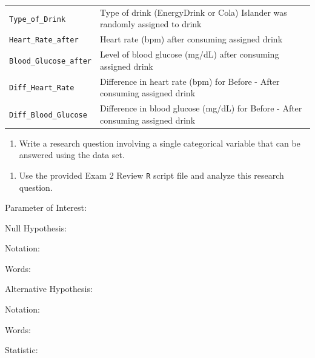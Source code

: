 \documentclass[
]{report}
\providecommand{\tightlist}{%
  \setlength{\itemsep}{0pt}\setlength{\parskip}{0pt}}
\newcommand{\rgi}{\hspace{24pt}}  %
\begin{document}
\begin{longtable}[]{@{}
  >{\raggedright\arraybackslash}p{}
  >{\raggedright\arraybackslash}p{}@{}}
\texttt{Type\_of\_Drink} & Type of drink (EnergyDrink or Cola) Islander was randomly assigned to drink \\
\texttt{Heart\_Rate\_after} & Heart rate (bpm) after consuming assigned drink \\
\texttt{Blood\_Glucose\_after} & Level of blood glucose (mg/dL) after consuming assigned drink \\
\texttt{Diff\_Heart\_Rate} & Difference in heart rate (bpm) for Before - After consuming assigned drink \\
\texttt{Diff\_Blood\_Glucose} & Difference in blood glucose (mg/dL) for Before - After consuming assigned drink \\
\bottomrule
\end{longtable}

\begin{enumerate}
\def\labelenumi{\arabic{enumi}.}
\tightlist
\item
  Write a research question involving a single categorical variable that can be answered using the data set.
\end{enumerate}

\vspace{0.8in}
\newpage

\begin{enumerate}
\def\labelenumi{\arabic{enumi}.}
\setcounter{enumi}{1}
\tightlist
\item
  Use the provided Exam 2 Review \texttt{R} script file and analyze this research question.
\end{enumerate}

\rgi Parameter of Interest:

\vspace{0.3in}

\rgi Null Hypothesis:

\rgi \rgi Notation:

\vspace{0.3in}

\rgi \rgi Words:

\vspace{0.5in}

\rgi Alternative Hypothesis:

\rgi \rgi Notation:

\vspace{0.3in}

\rgi \rgi Words:

\vspace{0.5in}

\rgi Statistic:
\end{document}
